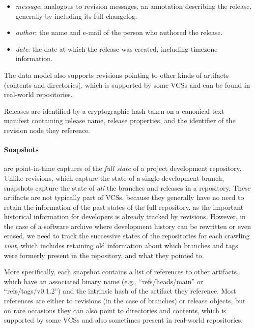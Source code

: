 \begin{itemize}
    \setlength\itemsep{0em}
    \item \emph{message}: analogous to revision messages, an annotation
        describing the release, generally by including its full changelog.
    \item \emph{author}: the name and e-mail of the person who authored the
        release.
    \item \emph{date}: the date at which the release was created, including
        timezone information.
\end{itemize}

The data model also supports revisions pointing to other kinds of artifacts
(contents and directories), which is supported by some \glspl{VCS} and can be
found in real-world repositories.

Releases are identified by a cryptographic hash taken on a canonical text
manifest containing release name, release properties, and the identifier of the
revision node they reference.


\begin{figure}\centering
{}
\end{figure}
\paragraph{\textbf{Snapshots}} are point-in-time captures of the \emph{full
state} of a project development repository. Unlike revisions, which capture the
state of a single development branch, snapshots capture the state of \emph{all}
the branches and releases in a repository. These artifacts are not typically
part of \glspl{VCS}, because they generally have no need to retain the
information of the past states of the full repository, as the important
historical information for developers is already tracked by revisions. However,
in the case of a software archive where development history can be rewritten or
even erased, we need to track the successive states of the repositories for
each crawling \emph{visit}, which includes retaining old information about
which branches and tags were formerly present in the repository, and what they
pointed to.

More specifically, each snapshot contains a list of references to other
artifacts, which have an associated binary name (e.g., ``refs/heads/main'' or
``refs/tags/v0.1.2'') and the intrinsic hash of the artifact they reference.
Most references are either to revisions (in the case of branches) or release
objects, but on rare occasions they can also point to directories and
contents, which is supported by some \glspl{VCS} and also sometimes present in
real-world repositories.

